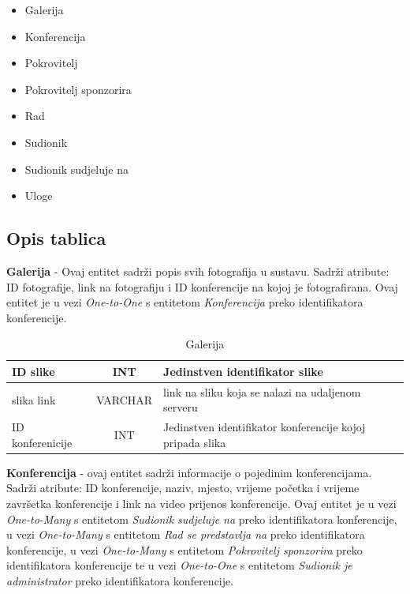 \begin{itemize}
	\item Galerija
	\item Konferencija
	\item Pokrovitelj
	\item Pokrovitelj sponzorira
	\item Rad
	\item Sudionik
	\item Sudionik sudjeluje na
	\item Uloge
\end{itemize}
		
			\subsection{Opis tablica}

\textbf{Galerija} - Ovaj entitet sadrži popis svih fotografija u sustavu. Sadrži atribute: ID fotografije, link na fotografiju i ID konferencije na kojoj je fotografirana. Ovaj entitet je u vezi \textit{One-to-One} s entitetom \textit{Konferencija} preko identifikatora konferencije.

\begin{table}[H]
	\caption{Galerija}
	\label{tbl:galerija}
	\centering
	\begin{tabular}{|l|c|l|} 
		\hline
		\cellcolor{lightgreen}ID slike & INT & Jedinstven identifikator slike\\ 
		\hline
		slika link & VARCHAR & link na sliku koja se nalazi na udaljenom serveru\\ 
		\hline
		\cellcolor{lightblue}ID konferenicije & INT & Jedinstven identifikator konferencije kojoj pripada slika\\ 
		\hline
	\end{tabular}
\end{table}

\textbf{Konferencija} - ovaj entitet sadrži informacije o pojedinim konferencijama. Sadrži atribute: ID konferencije, naziv, mjesto, vrijeme početka i vrijeme završetka konferencije i link na video prijenos konferencije. Ovaj entitet je u vezi \textit{One-to-Many} s entitetom \textit{Sudionik sudjeluje na} preko identifikatora konferencije, u vezi \textit{One-to-Many} s entitetom \textit{Rad se predstavlja na} preko identifikatora konferencije, u vezi \textit{One-to-Many} s entitetom \textit{Pokrovitelj sponzorira} preko identifikatora konferencije te u vezi \textit{One-to-One} s entitetom \textit{Sudionik je administrator} preko identifikatora konferencije.

